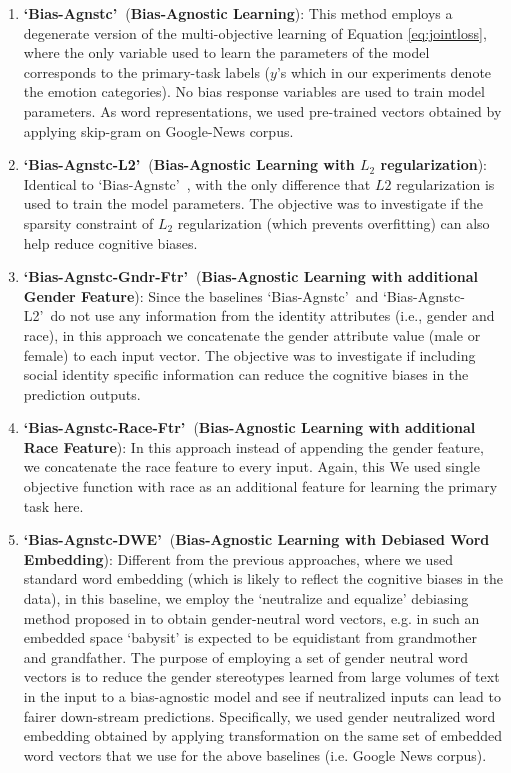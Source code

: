 \documentclass[letterpaper]{article}
\newcommand{\STWR}{`Bias-Agnstc-L2'~}
\newcommand{\STWOR}{`Bias-Agnstc'~}
\newcommand{\STWRG}{`Bias-Agnstc-Gndr-Ftr'~}
\newcommand{\STWRR}{`Bias-Agnstc-Race-Ftr'~}
\newcommand{\STWRDW}{`Bias-Agnstc-DWE'~}
\begin{document}
\begin{enumerate}
\item 
\textbf{\STWOR}(\textbf{Bias-Agnostic Learning}): This method employs a degenerate version of the multi-objective learning of Equation \ref{eq:jointloss}, where the only variable used to learn the parameters of the model corresponds to the primary-task labels ($y$'s which in our experiments denote the emotion categories). No bias response variables are used to train model parameters. As word representations, we used pre-trained vectors obtained by applying skip-gram \citep{Mikolov13} on Google-News corpus.
\item
\textbf{\STWR}(\textbf{Bias-Agnostic Learning with $L_2$ regularization}): Identical to \STWOR, with the only difference that $L2$ regularization is used to train the model parameters.
The objective was to investigate if the sparsity constraint of $L_2$ regularization (which prevents overfitting) can also help reduce cognitive biases. 

\item
\textbf{\STWRG}(\textbf{Bias-Agnostic Learning with additional Gender Feature}): Since the baselines \STWOR and \STWR do not
use any information from the identity attributes (i.e., gender and race), in this approach we concatenate the gender attribute value (male or female) to each input vector. The objective was to investigate if including social identity specific information can reduce the cognitive biases in the prediction outputs. 

\item
\textbf{\STWRR}(\textbf{Bias-Agnostic Learning with additional Race Feature}): In this approach instead of appending the gender feature, we concatenate the race feature to every input. Again, this We used single objective function with race as an additional feature for learning the primary task here.

\item
\textbf{\STWRDW}(\textbf{Bias-Agnostic Learning with Debiased Word Embedding}): Different from the previous approaches, where we used standard word embedding (which is likely to reflect the cognitive biases in the data), in this baseline, we employ the `neutralize and equalize' debiasing method proposed in \citep{Bolukbasi:2016} to obtain gender-neutral word vectors, e.g. in such an embedded space `babysit' is expected to be equidistant from grandmother and grandfather. The purpose of employing a set of gender neutral word vectors is to reduce the gender stereotypes learned from large volumes of text in the input to a bias-agnostic model and see if neutralized inputs can lead to fairer down-stream predictions. Specifically, we used gender neutralized word embedding obtained by applying transformation on the same set of embedded word vectors that we use for the above baselines (i.e. Google News corpus).      


\end{enumerate}
\end{document}
